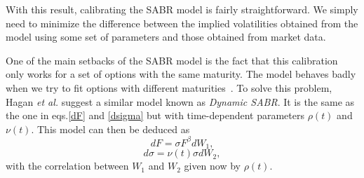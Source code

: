 With this result, calibrating the SABR model is fairly straightforward. We simply need to minimize the difference between the implied volatilities obtained from the model using some set of parameters and those obtained from market data.

One of the main setbacks of the SABR model is the fact that this calibration only works for a set of options with the same maturity. The model behaves badly when we try to fit options with different maturities~\cite{Hagan}. To solve this problem, Hagan \textit{et al.} suggest a similar model known as \emph{Dynamic SABR}. It is the same as the one in eqs.\eqref{dF} and \eqref{dsigma} but with time-dependent parameters $\rho(t)$ and $\nu(t)$.
This model can then be deduced as
\begin{equation}\label{dF2}
dF=\sigma F^\beta dW_1,
\end{equation}
\begin{equation}\label{dsigma2}
d\sigma=\nu(t)\sigma dW_2,
\end{equation}
\noindent with the correlation between $W_1$ and $W_2$ given now by $\rho(t)$.

